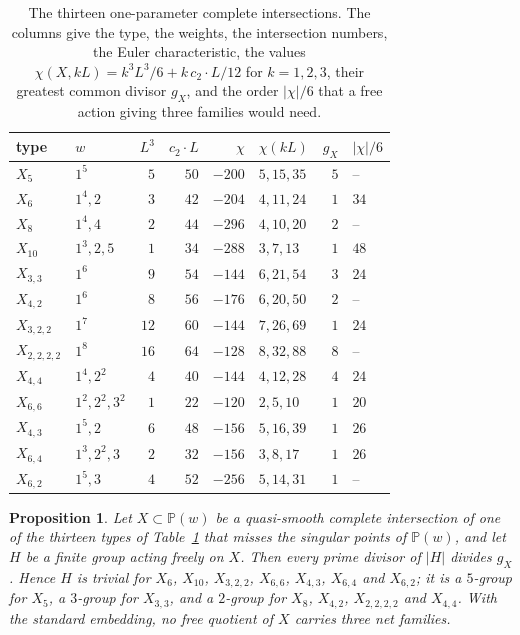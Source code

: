 \documentclass[11pt]{amsart}
\newtheorem{proposition}[theorem]{Proposition}
\theoremstyle{definition}
\theoremstyle{remark}
\newcommand{\PP}{\mathbb{P}}
\begin{document}
\begin{table}[t]
\caption{The thirteen one-parameter complete intersections. The columns
give the type, the weights, the intersection numbers, the Euler
characteristic, the values $\chi(X,kL)=k^3L^3/6+k\,c_2\cdot L/12$ for
$k=1,2,3$, their greatest common divisor $g_X$, and the order $|\chi|/6$
that a free action giving three families would need.}
\label{tab:freequot}
\centering
\begin{tabular}{llrrrlrl}
\toprule
type & $w$ & $L^3$ & $c_2\cdot L$ & $\chi$ & $\chi(kL)$ & $g_X$ & $|\chi|/6$\\
\midrule
$X_5$ & $1^5$ & $5$ & $50$ & $-200$ & $5,15,35$ & $5$ & --\\
$X_6$ & $1^4,2$ & $3$ & $42$ & $-204$ & $4,11,24$ & $1$ & $34$\\
$X_8$ & $1^4,4$ & $2$ & $44$ & $-296$ & $4,10,20$ & $2$ & --\\
$X_{10}$ & $1^3,2,5$ & $1$ & $34$ & $-288$ & $3,7,13$ & $1$ & $48$\\
$X_{3,3}$ & $1^6$ & $9$ & $54$ & $-144$ & $6,21,54$ & $3$ & $24$\\
$X_{4,2}$ & $1^6$ & $8$ & $56$ & $-176$ & $6,20,50$ & $2$ & --\\
$X_{3,2,2}$ & $1^7$ & $12$ & $60$ & $-144$ & $7,26,69$ & $1$ & $24$\\
$X_{2,2,2,2}$ & $1^8$ & $16$ & $64$ & $-128$ & $8,32,88$ & $8$ & --\\
$X_{4,4}$ & $1^4,2^2$ & $4$ & $40$ & $-144$ & $4,12,28$ & $4$ & $24$\\
$X_{6,6}$ & $1^2,2^2,3^2$ & $1$ & $22$ & $-120$ & $2,5,10$ & $1$ & $20$\\
$X_{4,3}$ & $1^5,2$ & $6$ & $48$ & $-156$ & $5,16,39$ & $1$ & $26$\\
$X_{6,4}$ & $1^3,2^2,3$ & $2$ & $32$ & $-156$ & $3,8,17$ & $1$ & $26$\\
$X_{6,2}$ & $1^5,3$ & $4$ & $52$ & $-256$ & $5,14,31$ & $1$ & --\\
\bottomrule
\end{tabular}
\end{table}

\begin{proposition}\label{prop:freequot}
Let $X\subset\PP(w)$ be a quasi-smooth complete intersection of one of the
thirteen types of Table~\ref{tab:freequot} that misses the singular points
of $\PP(w)$, and let $H$ be a finite group acting freely on $X$. Then every
prime divisor of $|H|$ divides $g_X$. Hence $H$ is trivial for $X_6$,
$X_{10}$, $X_{3,2,2}$, $X_{6,6}$, $X_{4,3}$, $X_{6,4}$ and $X_{6,2}$; it is
a $5$-group for $X_5$, a $3$-group for $X_{3,3}$, and a $2$-group for
$X_8$, $X_{4,2}$, $X_{2,2,2,2}$ and $X_{4,4}$. With the standard embedding,
no free quotient of $X$ carries three net families.
\end{proposition}
\end{document}
